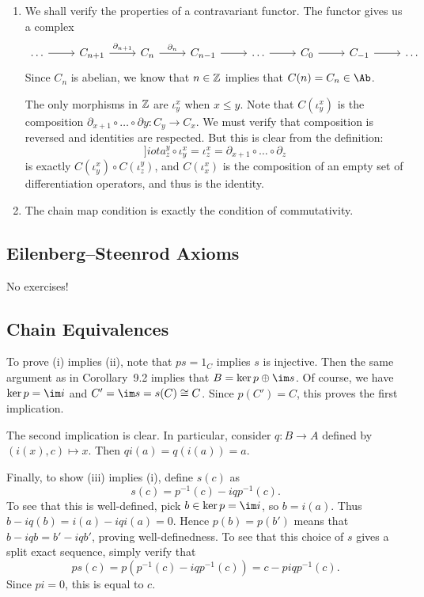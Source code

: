 \documentclass[../../solutions.tex]{subfiles}
\begin{document}
\begin{exercise} \leavevmode
\begin{enumerate}
\item
We shall verify the properties of a contravariant functor.
The functor gives us a complex
\[
\begin{tikzcd}
\dots\ar[r] & C_{n+1}\ar[r,"\partial_{n+1}"] & C_n\ar[r,"\partial_n"] & C_{n-1}\ar[r] & \dots\ar[r] & C_0\ar[r] & C_{-1}\ar[r] & \dots
\end{tikzcd}
\]
Since $C_n$ is abelian, we know that $n\in\mathbb{Z}$ implies that $C(n)=C_n\in\Ab$.

The only morphisms in $\mathbb{Z}$ are $\iota^x_y$ when $x\le y$.
Note that $C(\iota^x_y)$ is the composition $\partial_{x+1}\circ\dots\circ\partial y:C_y\to C_x$.
We must verify that composition is reversed and identities are respected.
But this is clear from the definition:
\[]iota_z^y\circ\iota_y^x=\iota_z^x=\partial_{x+1}\circ\dots\circ\partial_z\]
is exactly $C(\iota^x_y)\circ C(\iota^y_z)$, and $C(\iota^x_x)$ is the composition of an empty set of differentiation operators, and thus is the identity.

\item
The chain map condition is exactly the condition of commutativity.
\end{enumerate}
\end{exercise}

\subsection{Eilenberg--Steenrod Axioms}
No exercises!

\subsection{Chain Equivalences}
\begin{exercise} \leavevmode
To prove (i) implies (ii), note that $ps=1_C$ implies $s$ is injective.
Then the same argument as in Corollary~9.2 implies that $B=\ker p\oplus\im s$.
Of course, we have $\ker p=\im i$ and $C'=\im s=s(C)\cong C$.
Since $p(C')=C$, this proves the first implication.

The second implication is clear.
In particular, consider $q:B\to A$ defined by $(i(x),c)\mapsto x$.
Then $qi(a)=q(i(a))=a$.

Finally, to show (iii) implies (i), define $s(c)$ as
\[s(c)=p^{-1}(c)-iqp^{-1}(c).\]
To see that this is well-defined, pick $b\in\ker p=\im i$, so $b=i(a)$.
Thus $b-iq(b)=i(a)-iqi(a)=0$.
Hence $p(b)=p(b')$ means that $b-iqb=b'-iqb'$, proving well-definedness.
To see that this choice of $s$ gives a split exact sequence, simply verify that
\[ps(c)=p(p^{-1}(c)-iqp^{-1}(c))=c-piqp^{-1}(c).\]
Since $pi=0$, this is equal to $c$.
\end{exercise}
\end{document}
